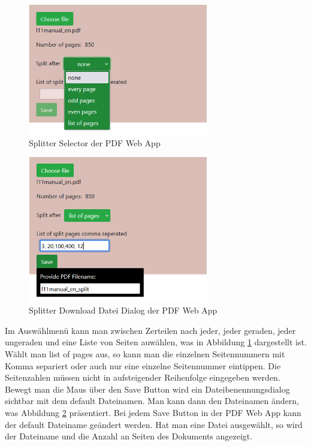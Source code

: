 \begin{figure}[!htbp]
	\centering
	\includegraphics[width=0.7\textwidth]{"images/splitter2.png"}
	\caption{Splitter Selector der PDF Web App}
	\label{fig:splitter2}
\end{figure}

\begin{figure}[!htbp]
	\centering
	\includegraphics[width=0.7\textwidth]{"images/splitter3.png"}
	\caption{Splitter Download Datei Dialog der PDF Web App}
	\label{fig:splitter3}
\end{figure}

Im Auswählmenü kann man zwischen Zerteilen nach jeder, jeder geraden, jeder ungeraden und eine Liste von Seiten auwählen, was in Abbildung \ref{fig:splitter2} dargestellt ist. Wählt man list of pages aus, so kann man die einzelnen Seitennummern mit Komma separiert oder auch nur eine einzelne Seitennummer eintippen. Die Seitenzahlen müssen nicht in aufsteigender Reihenfolge eingegeben werden. Bewegt man die Maus über den Save Button wird ein Dateibenennungsdialog sichtbar mit dem default Dateinamen. Man kann dann den Dateinamen ändern, was Abbildung \ref{fig:splitter3} präsentiert. Bei jedem Save Button in der PDF Web App kann der default Dateiname geändert werden. Hat man eine Datei ausgewählt, so wird der Dateiname und die Anzahl an Seiten des Dokuments angezeigt. \\

